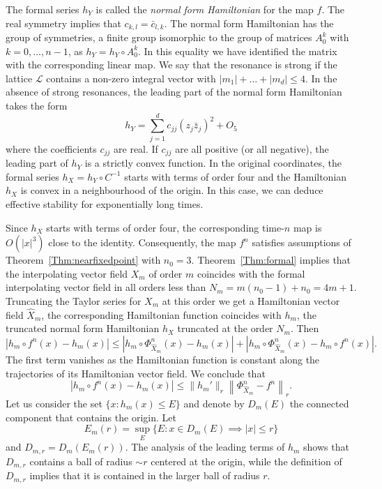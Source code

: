 \documentclass[a4paper,12pt]{article}
\begin{document}
The formal series $h_Y$ is called the {\em  normal form Hamiltonian\/} for the map $f$.
The real symmetry implies that $c_{k,l}=\bar c_{l,k}$. 
The normal form Hamiltonian has the group of symmetries, a finite group isomorphic to the group
 of matrices $A_0^k$ with $k=0,\ldots,n-1$, as $h_Y=h_Y\circ A_0^k$. In this equality we have identified the
 matrix with the corresponding linear map.
 We say that the resonance is strong if the lattice $\mathcal L$ contains a non-zero integral
 vector with $|m_1|+\ldots +|m_d|\le 4$.
In the absence of strong resonances, the leading part of the normal form Hamiltonian takes the form
\[
h_Y
=
\sum_{j=1}^d c_{jj} (z_j\bar z_j)^2
+O_5
\]
where the coefficients $c_{jj}$ are real. If $c_{jj}$ are all positive (or all  negative),  the leading part of $h_Y$ is a strictly convex function.
In the original coordinates, the formal series $h_X=h_Y\circ C^{-1}$ starts with terms of order four
and the Hamiltonian $h_X$ is convex in a neighbourhood of the origin.
In this case,  we can deduce effective stability for exponentially long times. 

Since $h_X$ starts with terms of order four, the corresponding time-$n$
map is $O(|x|^3)$ close to the identity. Consequently,
 the map $f^n$ satisfies assumptions of Theorem~\ref{Thm:nearfixedpoint} with $n_0=3$.
 Theorem~\ref{Thm:formal}
implies that the interpolating vector field $X_{m}$
of order $m$
coincides with the formal interpolating vector field in all orders less 
than  $N_m=m(n_0-1)+n_0=4m+1$.   
Truncating the Taylor series for $X_m$ at this order we get
a Hamiltonian vector field $\hat X_m$, the corresponding
Hamiltonian function coincides with $h_m$, the truncated normal form Hamiltonian
$h_{X}$ truncated at the order $N_m$. Then 
\[
|h_m\circ f^n(x)-h_m(x)|\le \left|h_m\circ \Phi^n_{\hat X_m}(x)-h_m(x)\right|+\left|h_m\circ \Phi^n_{\hat X_m}(x)-h_m\circ f^n(x)\right|.
\]
The first term vanishes as the Hamiltonian function is constant along the
trajectories of its Hamiltonian vector field. We conclude that 
\[
|h_m\circ f^n(x)-h_m(x)|\le \|h_m'\|_{r}\left\| \Phi^n_{\hat X_m}- f^n\right\|_r.
\]
Let us consider the set $\{x:h_m(x)\le E\}$ and denote 
by $D_m(E)$ the connected component that contains the origin.
Let \[E_m(r)=\sup_{E}\bigl\{E: x\in D_m(E) \implies |x|\le r \bigr\}\]
and  $D_{m,r}= D_m(E_m(r))$. 
The analysis of the leading terms
of $h_m$ shows that  $D_{m,r}$ contains a ball of radius $\sim r$ centered at the origin,
while  the definition of $D_{m,r}$ implies that it
is contained in the larger ball of radius $r$.
\end{document}
